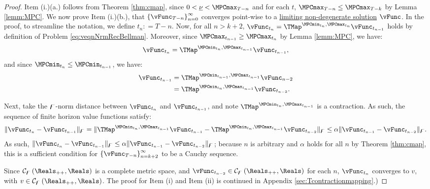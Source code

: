 \documentclass[BufferStockTheory]{subfiles}
\begin{document}
\begin{proof}

Item (i.)(a.) follows from Theorem \ref{thm:cmap}, since $0<\MPCminInf<\MPCmax_{T-n}$ and for each $t$, $\MPCmax_{T-n}\leq \MPCmax_{T-k}$ by Lemma \ref{lemm:MPC}.
We now prove Item (i.)(b.), that $\left\{\vFunc_{T-n}\right\}_{n=0}^{\infty}$ converges point-wise to a \hyperlink{Definition-of-a-non-degenerate-Solution}{limiting non-degenerate solution} $\vFunc$.
In the proof, to streamline the notation, we define $t_{n}\colon = T - n$.
Now, for all $n>k+2$, $\vFunc_{t_{n}} = \TMap^{\MPCmin_{t_{n}}, \MPCmax_{t_{n}}}\vFunc_{t_{n-1}}$ holds by definition of Problem \eqref{eq:veqnNrmRecBellman}.
Moreover, since $\MPCmax_{t_{n-1}}\geq \MPCmax_{t_{n}}$ by Lemma \ref{lemm:MPC}, we have:
%
\begin{equation*}
\vFunc_{t_{n}} = \TMap^{\MPCmin_{t_{n}}, \MPCmax_{t_{n-1}}}\vFunc_{t_{n-1}}, 
\end{equation*}
%
and since $\MPCmin_{t_{n}}\leq \MPCmin_{t_{n-1}}$, we have:
%
\begin{equation}\begin{gathered}\begin{aligned}
\vFunc_{t_{n-1}} &  = \TMap^{\MPCmin_{t_{n-1}}, \MPCmax_{t_{n-1}}}\vFunc_{n-2}\\ &  = \TMap^{\MPCmin_{t_{n}}, \MPCmax_{t_{n-1}}}\vFunc_{t_{n-2}}. 
\end{aligned}\end{gathered}\end{equation}

Next, take the $\digamma$-norm distance between $\vFunc_{t_{n}}$ and $\vFunc_{t_{n-1}}$, and note  $\TMap^{\MPCmin_{t_{n}}, \MPCmax_{t_{n-1}}}$ is a contraction.
As such, the sequence of finite horizon value functions satisfy:
%
\begin{equation*}
\Vert\vFunc_{t_{n}} - \vFunc_{t_{n-1}}\Vert_{\boundFunc} = \Vert\TMap^{\MPCmin_{t_{n}}, \MPCmax_{t_{n-1}}}\vFunc_{t_{n-1}} - \TMap^{\MPCmin_{t_{n}}, \MPCmax_{t_{n-1}}}\vFunc_{t_{n-2}}\Vert_{\boundFunc} \leq \Shrinker \Vert \vFunc_{t_{n-1}} - \vFunc_{t_{n-2}}\Vert_{\boundFunc}. 
\end{equation*}
%
As such, $\Vert \vFunc_{t_{n}} - \vFunc_{t_{n-1}}\Vert_{\boundFunc } \leq \Shrinker \Vert \vFunc_{t_{n-1}} - \vFunc_{t_{n-2}}\Vert_{\boundFunc } $; because $n$ is arbitrary and $\alpha$ holds for all $n$ by Theorem \ref{thm:cmap}, this is a sufficient condition for  $\left\{\vFunc_{T-n}\right\}_{n=k+2}^{\infty}$ to be a Cauchy sequence.

Since $\mathcal{C}_{\boundFunc }\left(\Reals_{++},\Reals\right) $ is a complete metric space, and $\vFunc_{t_{n-2}} \in \mathcal{C}_{\boundFunc }\left(\Reals_{++},\Reals\right)$ for each $n$, $\vFunc_{t_{n}}$ converges to $v$, with $v\in \mathcal{C}_{\boundFunc }\left(\Reals_{++},\Reals\right)$.
The proof for Item (i) and Item (ii) is continued in Appendix \ref{sec:Tcontractionmapping}.)
\end{proof}
\end{document}
